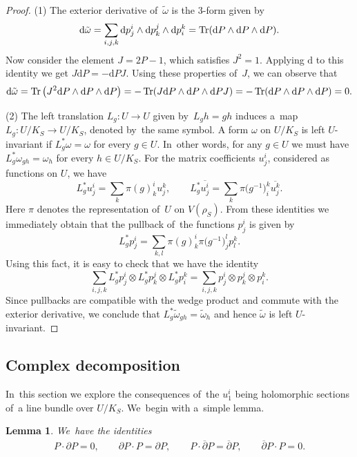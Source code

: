 \documentclass[10pt,a4paper]{amsart}
\numberwithin{equation}{section}
\newtheorem{Lemma}[Theorem]{Lemma}
\newcommand{\diff}{\mathrm{d}}
\newcommand{\del}{\partial}
\newcommand{\delbar}{\overline{\partial}}
\newcommand{\kafot}{\tilde{\omega}}
\begin{document}
\begin{proof}
(1) The exterior derivative of~$\kafot$ is the $3$-form given by
\[
\diff \kafot = \sum_{i, j, k} \diff p^i_j \wedge \diff p^j_k \wedge \diff p^k_i = \mathop{\rm Tr}(\diff P \wedge \diff P \wedge \diff P).
\]
Now consider the element $J = 2 P - 1$, which satisfies $J^2 = 1$.
Applying $\diff$ to this identity we get $J \diff P = - \diff P J$.
Using these properties of~$J$, we can observe that
\[
\diff \kafot = \mathop{\rm Tr}\big(J^2 \diff P \wedge \diff P \wedge \diff P\big) = - \mathop{\rm Tr}(J \diff P \wedge \diff P \wedge \diff P J)
 = - \mathop{\rm Tr}(\diff P \wedge \diff P \wedge \diff P) = 0.
\]

(2) The left translation $L_g\colon U \to U$ given by~$L_g h = g h$ induces a~map $L_g\colon U / K_S \to U / K_S$, denoted by~the same symbol.
A form $\omega$ on $U / K_S$ is left $U$-invariant if $L_g^* \omega = \omega$ for every $g \in U$.
In~other words, for any $g \in U$ we must have $L_g^* \omega_{g h} = \omega_h$ for every $h \in U / K_S$.
For the matrix coefficients $u^i_j$, considered as functions on $U$, we have
\[
L_g^* u^i_j = \sum_k \pi(g)^i_k u^k_j, \qquad
L_g^* \overline{u^i_j} = \sum_k \pi\big(g^{-1}\big)^k_i \overline{u^k_j}.
\]
Here $\pi$ denotes the representation of~$U$ on $V(\rho_S)$.
From these identities we immediately obtain that the pullback of~the functions $p^i_j$ is given by
\[
L_g^* p^i_j = \sum_{k, l} \pi(g)^i_k \pi\big(g^{-1}\big)^l_j p^k_l.
\]
Using this fact, it is easy to check that we have the identity
\[
\sum_{i, j, k} L_g^* p^i_j \otimes L_g^* p^j_k \otimes L_g^* p^k_i = \sum_{i, j, k} p^i_j \otimes p^j_k \otimes p^k_i.
\]
Since pullbacks are compatible with the wedge product and commute with the exterior derivative, we conclude that $L_g^* \kafot_{g h} = \kafot_h$ and hence $\kafot$ is left $U$-invariant.
\end{proof}

\subsection{Complex decomposition}

In~this section we explore the consequences of~the $u^i_1$ being holomorphic sections of~a line bundle over $U / K_S$.
We~begin with a~simple lemma.

\begin{Lemma}
\label{lem:diff-ids}
We~have the identities
\begin{gather*}
P \cdot \del P = 0,
\qquad \del P \cdot P = \del P,
\qquad
 P \cdot \delbar P = \delbar P, \qquad
 \delbar P \cdot P = 0.
\end{gather*}
\end{Lemma}
\end{document}
